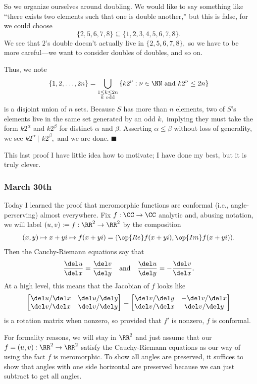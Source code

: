 So we organize ourselves around doubling. We would like to say something like ``there exists two elements such that one is double another,'' but this is false, for we could choose
\[\{2,5,6,7,8\}\subseteq\{1,2,3,4,5,6,7,8\}.\]
We see that $2$'s double doesn't actually live in $\{2,5,6,7,8\},$ so we have to be more careful---we want to consider doubles of doubles, and so on.

Thus, we note
\[\{1,2,\ldots,2n\}=\bigcup_{\substack{1\le k\le 2n\\k\text{ odd}}}\left\{k2^\nu:\nu\in\NN\text{ and }k2^\nu\le2n\right\}\]
is a disjoint union of $n$ sets. Because $S$ has more than $n$ elements, two of $S$'s elements live in the same set generated by an odd $k,$ implying they must take the form $k2^\alpha$ and $k2^\beta$ for distinct $\alpha$ and $\beta.$ Asserting $\alpha\le\beta$ without loss of generality, we see $k2^\alpha\mid k2^\beta,$ and we are done. $\blacksquare$

This last proof I have little idea how to motivate; I have done my best, but it is truly clever.

\subsubsection{March 30th}
Today I learned the proof that meromorphic functions are conformal (i.e., angle-perserving) almost everywhere. Fix $f:\CC\to\CC$ analytic and, abusing notation, we will label $(u,v):=f:\RR^2\to\RR^2$ by the composition
\[(x,y)\mapsto x+yi\mapsto f(x+yi)=(\op{Re}f(x+yi),\op{Im}f(x+yi)).\]Then the Cauchy-Riemann equations say that
\[\frac{\del u}{\del x}=\frac{\del v}{\del y}\quad\text{and}\quad\frac{\del u}{\del y}=-\frac{\del v}{\del x}.\]
At a high level, this means that the Jacobian of $f$ looks like
\[\begin{bmatrix}
    \del u/\del x & \del u/\del y \\
    \del v/\del x & \del v/\del y
\end{bmatrix}=\begin{bmatrix}
    \del v/\del y & -\del v/\del x \\
    \del v/\del x & \del v/\del y
\end{bmatrix}\]
is a rotation matrix when nonzero, so provided that $f'$ is nonzero, $f$ is conformal.

For formality reasons, we will stay in $\RR^2$ and just assume that our $f=(u,v):\RR^2\to\RR^2$ satisfy the Cauchy-Riemann equations as our way of using the fact $f$ is meromorphic. To show all angles are preserved, it suffices to show that angles with one side horizontal are preserved because we can just subtract to get all angles.

